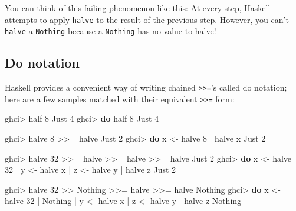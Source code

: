 \documentclass[]{article}
\newenvironment{Shaded}{}{}
\newcommand{\DataTypeTok}[1]{\textcolor[rgb]{0.56,0.13,0.00}{#1}}
\newcommand{\DecValTok}[1]{\textcolor[rgb]{0.25,0.63,0.44}{#1}}
\newcommand{\FunctionTok}[1]{\textcolor[rgb]{0.02,0.16,0.49}{#1}}
\newcommand{\KeywordTok}[1]{\textcolor[rgb]{0.00,0.44,0.13}{\textbf{#1}}}
\newcommand{\NormalTok}[1]{#1}
\newcommand{\OtherTok}[1]{\textcolor[rgb]{0.00,0.44,0.13}{#1}}
\begin{document}
You can think of this failing phenomenon like this: At every step, Haskell
attempts to apply \texttt{halve} to the result of the previous step. However,
you can't \texttt{halve} a \texttt{Nothing} because a \texttt{Nothing} has no
value to halve!

\hypertarget{do-notation}{%
\subsection{Do notation}\label{do-notation}}

Haskell provides a convenient way of writing chained
\texttt{\textgreater{}\textgreater{}=}'s called do notation; here are a few
samples matched with their equivalent \texttt{\textgreater{}\textgreater{}=}
form:

\begin{Shaded}
\begin{Highlighting}[]
\NormalTok{ghci}\FunctionTok{>}\NormalTok{ half }\DecValTok{8}
\DataTypeTok{Just} \DecValTok{4}
\NormalTok{ghci}\FunctionTok{>} \KeywordTok{do}\NormalTok{  half }\DecValTok{8}
\DataTypeTok{Just} \DecValTok{4}

\NormalTok{ghci}\FunctionTok{>}\NormalTok{ halve }\DecValTok{8} \FunctionTok{>>=}\NormalTok{ halve}
\DataTypeTok{Just} \DecValTok{2}
\NormalTok{ghci}\FunctionTok{>} \KeywordTok{do}\NormalTok{  x }\OtherTok{<-}\NormalTok{ halve }\DecValTok{8}
    \FunctionTok{|}\NormalTok{     halve x}
\DataTypeTok{Just} \DecValTok{2}

\NormalTok{ghci}\FunctionTok{>}\NormalTok{ halve }\DecValTok{32} \FunctionTok{>>=}\NormalTok{ halve }\FunctionTok{>>=}\NormalTok{ halve }\FunctionTok{>>=}\NormalTok{ halve}
\DataTypeTok{Just} \DecValTok{2}
\NormalTok{ghci}\FunctionTok{>} \KeywordTok{do}\NormalTok{  x }\OtherTok{<-}\NormalTok{ halve }\DecValTok{32}
    \FunctionTok{|}\NormalTok{     y }\OtherTok{<-}\NormalTok{ halve x}
    \FunctionTok{|}\NormalTok{     z }\OtherTok{<-}\NormalTok{ halve y}
    \FunctionTok{|}\NormalTok{     halve z}
\DataTypeTok{Just} \DecValTok{2}

\NormalTok{ghci}\FunctionTok{>}\NormalTok{ halve }\DecValTok{32} \FunctionTok{>>} \DataTypeTok{Nothing} \FunctionTok{>>=}\NormalTok{ halve }\FunctionTok{>>=}\NormalTok{ halve}
\DataTypeTok{Nothing}
\NormalTok{ghci}\FunctionTok{>} \KeywordTok{do}\NormalTok{  x }\OtherTok{<-}\NormalTok{ halve }\DecValTok{32}
    \FunctionTok{|}     \DataTypeTok{Nothing}
    \FunctionTok{|}\NormalTok{     y }\OtherTok{<-}\NormalTok{ halve x}
    \FunctionTok{|}\NormalTok{     z }\OtherTok{<-}\NormalTok{ halve y}
    \FunctionTok{|}\NormalTok{     halve z}
\DataTypeTok{Nothing}
\end{Highlighting}
\end{Shaded}
\end{document}
